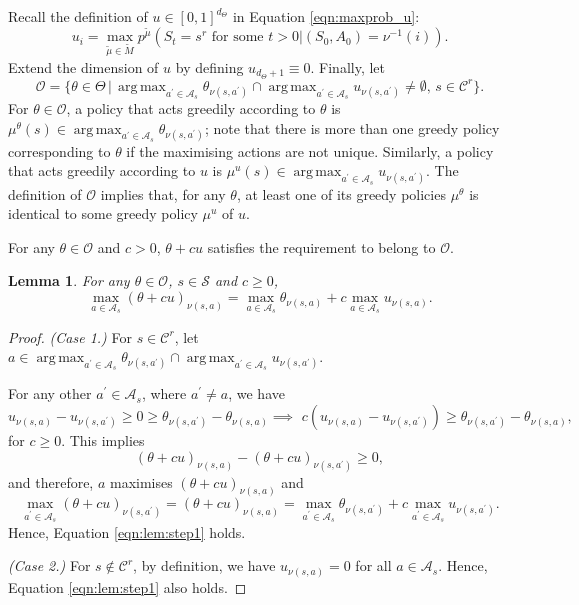 \documentclass{amsart}
\newtheorem{lemma}{Lemma}
\DeclareMathOperator*{\argmax}{arg\,max}
\begin{document}
Recall the definition of $u \in [0,1]^{d_{\Theta}}$ in Equation \ref{eqn:maxprob_u}: $$u_i=\max_{\tilde{\mu} \in \widetilde{M}} p^{\tilde{\mu}}(S_t=s^r \text{ for some } t > 0 |(S_0,A_0) = \nu^{-1}(i)).$$
Extend the dimension of $u$ by defining $u_{d_\Theta+1} \equiv 0$. Finally, let
$$\mathcal{O} = \Big\{\theta \in \Theta \,\Big| \,\argmax_{a^\prime \in \mathcal{A}_s} \theta_{\nu(s,a^\prime)} \cap \argmax_{a^\prime \in \mathcal{A}_s} u_{\nu(s,a^\prime)} \neq \emptyset, \, s \in \mathcal{C}^r\Big\}.$$ For $\theta \in \mathcal{O}$, a policy that acts greedily according to $\theta$ is  $\mu^\theta(s) \in \argmax_{a^\prime \in \mathcal{A}_s}\theta_{\nu(s,a^\prime)}$; note that there is more than one greedy policy corresponding to $\theta$ if the maximising actions are not unique. Similarly, a policy that acts greedily according to $u$ is $\mu^{u}(s) \in \argmax_{a^\prime \in \mathcal{A}_s}u_{\nu(s,a^\prime)}$. The definition of $\mathcal{O}$ implies that, for any $\theta$, at least one of its greedy policies  $\mu^\theta$ is identical to some greedy policy $\mu^u$ of $u$.

For any $\theta \in \mathcal{O}$ and $c>0$, $\theta + cu$ satisfies the requirement to belong to $\mathcal{O}$.

\begin{lemma}
For any $\theta \in \mathcal{O}$, $s \in \mathcal{S}$ and $c\geq 0$,
\begin{equation}
\max_{a \in \mathcal{A}_s} (\theta + cu)_{\nu(s,a)} = \max_{a \in \mathcal{A}_s} \theta_{\nu(s,a)} + c \max_{a \in \mathcal{A}_s} u_{\nu(s,a)} \label{eqn:lem:step1}.
\end{equation}
\label{lem:theta_plus_c_u}
\end{lemma}
\begin{proof}
{\it (Case 1.)} For $s \in \mathcal{C}^r$, let $a \in \argmax_{a^\prime \in \mathcal{A}_s} \theta_{\nu(s,a^\prime)} \cap \argmax_{a^\prime \in \mathcal{A}_s} u_{\nu(s,a^\prime)}$.

For any other $a^\prime \in \mathcal{A}_s$, where $a^\prime \neq a$, we have 
$$u_{\nu(s,a)} - u_{\nu(s,a^\prime)} \geq 0 \geq \theta_{\nu(s,a^\prime)} - \theta_{\nu(s,a)} \implies \,\, c( u_{\nu(s,a)} - u_{\nu(s,a^\prime)}) \geq \theta_{\nu(s,a^\prime)} - \theta_{\nu(s,a)},
$$ for  $c \geq 0$. This implies 
$$(\theta+cu)_{\nu(s,a)} - (\theta + cu)_{\nu(s,a^\prime)}  \geq 0,$$
and therefore, $a$ maximises $(\theta + cu)_{\nu(s,a)}$ and 
$$\max_{a^\prime \in \mathcal{A}_s} (\theta + cu)_{\nu(s,a^\prime)} = (\theta + cu)_{\nu(s,a)}  = \max_{a^\prime \in \mathcal{A}_s} \theta_{\nu(s,a^\prime)} + c \max_{a^\prime \in \mathcal{A}_s} u_{\nu(s,a^\prime)}.$$
Hence, Equation \ref{eqn:lem:step1} holds.

{\it (Case 2.)} For $s \notin \mathcal{C}^r$, by definition, we have $u_{\nu(s,a)} = 0$  for all $a \in \mathcal{A}_s$. Hence, 
Equation \ref{eqn:lem:step1} also holds.
\end{proof}
\end{document}
